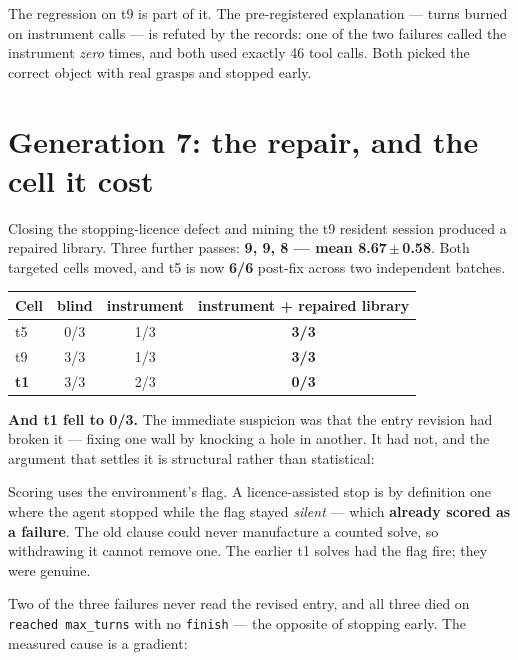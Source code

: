 \documentclass[11pt,a4paper]{report}
\begin{document}
The regression on t9 is part of it. The pre-registered explanation --- turns
burned on instrument calls --- is refuted by the records: one of the two
failures called the instrument \emph{zero} times, and both used exactly 46 tool
calls. Both picked the correct object with real grasps and stopped early.

\section{Generation 7: the repair, and the cell it cost}

Closing the stopping-licence defect and mining the t9 resident session produced
a repaired library. Three further passes: \textbf{9, 9, 8 --- mean
8.67\,$\pm$\,0.58}. Both targeted cells moved, and t5 is now \textbf{6/6}
post-fix across two independent batches.

\begin{table}[htbp]
\centering\small
\begin{tabular}{@{}l c c c@{}}
\toprule
\textbf{Cell} & \textbf{blind} & \textbf{instrument} & \textbf{instrument + repaired library} \\
\midrule
t5 & 0/3 & 1/3 & \textbf{3/3} \\
t9 & 3/3 & 1/3 & \textbf{3/3} \\
\textbf{t1} & 3/3 & 2/3 & \textbf{0/3} \\
\bottomrule
\end{tabular}
\end{table}

\noindent
\textbf{And t1 fell to 0/3.} The immediate suspicion was that the entry revision
had broken it --- fixing one wall by knocking a hole in another. It had not, and
the argument that settles it is structural rather than statistical:

\begin{caution}[title={Why a licence-assisted solve cannot be lost}]
Scoring uses the environment's flag. A licence-assisted stop is by definition
one where the agent stopped while the flag stayed \emph{silent} --- which
\textbf{already scored as a failure}. The old clause could never manufacture a
counted solve, so withdrawing it cannot remove one. The earlier t1 solves had
the flag fire; they were genuine.
\end{caution}

\noindent
Two of the three failures never read the revised entry, and all three died on
\texttt{reached max\_turns} with no \texttt{finish} --- the opposite of stopping
early. The measured cause is a gradient:
\end{document}
